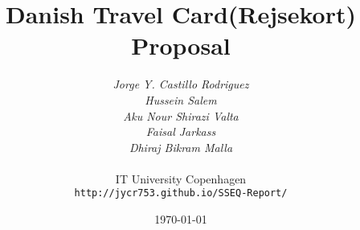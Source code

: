 \documentclass[10pt,a4paper,oneside]{scrreprt}
\begin{document}
\title{Danish Travel Card(Rejsekort) Proposal}
\author{\textit{Jorge Y. Castillo Rodriguez}\\
  \textit{Hussein Salem}\\
  \textit{Aku Nour Shirazi Valta}\\
  \textit{Faisal Jarkass}\\
  \textit{Dhiraj Bikram Malla}\\
  \\
  IT University Copenhagen\\
  \texttt{http://jycr753.github.io/SSEQ-Report/}}
\date{\today}
\maketitle



\end{document}
